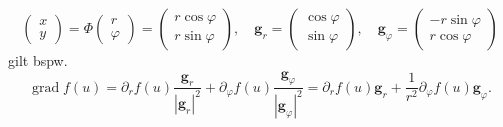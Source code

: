 \begin{equation}
\begin{pmatrix}x\\ y\end{pmatrix}
= \Phi\begin{pmatrix}r\\ \varphi\end{pmatrix}
= \begin{pmatrix}r\cos\varphi\\ r\sin\varphi\end{pmatrix},\quad
\mathbf g_r = \begin{pmatrix}\cos\varphi\\ \sin\varphi\end{pmatrix},\quad
\mathbf g_\varphi = \begin{pmatrix}-r\sin\varphi\\ r\cos\varphi\end{pmatrix}
\end{equation}
gilt bspw.
\begin{equation}
\operatorname{grad} f(u)
= \partial_r f(u)\frac{\mathbf g_r}{|\mathbf g_r|^2}
+ \partial_\varphi f(u)\frac{\mathbf g_\varphi}{|\mathbf g_\varphi|^2}
= \partial_r f(u)\mathbf g_r
+ \frac{1}{r^2}\partial_\varphi f(u)\mathbf g_\varphi.
\end{equation}

